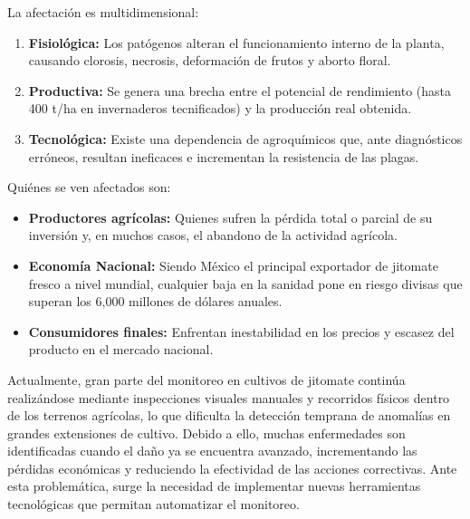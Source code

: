La afectación es multidimensional:

\begin{enumerate}[topsep=2pt, itemsep=4pt, parsep=0pt]
    \item \textbf{Fisiológica:} Los patógenos alteran el funcionamiento interno de la planta, causando clorosis, necrosis, deformación de frutos y aborto floral.
    \item \textbf{Productiva:} Se genera una brecha entre el potencial de rendimiento (hasta 400 t/ha en invernaderos tecnificados) y la producción real obtenida.
    \item \textbf{Tecnológica:} Existe una dependencia de agroquímicos que, ante diagnósticos erróneos, resultan ineficaces e incrementan la resistencia de las plagas.
\end{enumerate}

Quiénes se ven afectados son:

\begin{itemize}
    \item \textbf{Productores agrícolas:} Quienes sufren la pérdida total o parcial de su inversión y, en muchos casos, el abandono de la actividad agrícola.
    \item \textbf{Economía Nacional:} Siendo México el principal exportador de jitomate fresco a nivel mundial, cualquier baja en la sanidad pone en riesgo divisas que superan los 6{,}000 millones de dólares anuales.
    \item \textbf{Consumidores finales:} Enfrentan inestabilidad en los precios y escasez del producto en el mercado nacional.
\end{itemize}

Actualmente, gran parte del monitoreo en cultivos de jitomate continúa realizándose mediante inspecciones visuales manuales y recorridos físicos dentro de los terrenos agrícolas, lo que dificulta la detección temprana de anomalías en grandes extensiones de cultivo. Debido a ello, muchas enfermedades son identificadas cuando el daño ya se encuentra avanzado, incrementando las pérdidas económicas y reduciendo la efectividad de las acciones correctivas. Ante esta problemática, surge la necesidad de implementar nuevas herramientas tecnológicas que permitan automatizar el monitoreo.

\thispagestyle{empty}
